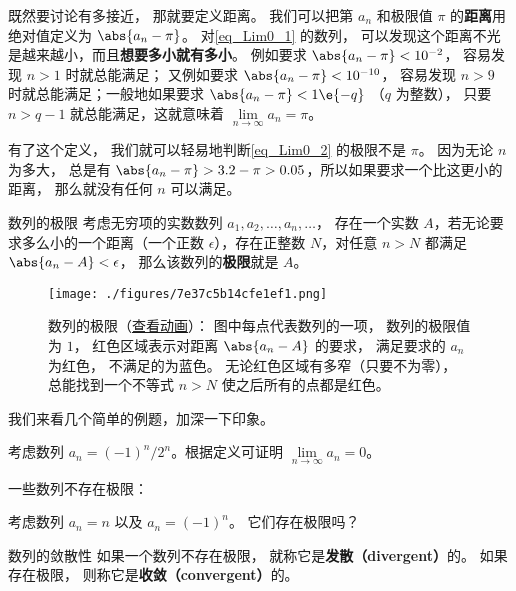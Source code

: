 既然要讨论有多接近， 那就要定义距离。 我们可以把第 $a_n$ 和极限值 $\pi$ 的\textbf{距离}用绝对值定义为 $\abs{a_n - \pi}$。 对\autoref{eq_Lim0_1} 的数列， 可以发现这个距离不光是越来越小，而且\textbf{想要多小就有多小}。 例如要求 $\abs{a_n - \pi} < 10^{-2}$， 容易发现 $n > 1$ 时就总能满足； 又例如要求 $\abs{a_n - \pi} < 10^{-10}$， 容易发现 $n > 9$ 时就总能满足；一般地如果要求 $\abs{a_n - \pi} < 1\e{-q}$ （$q$ 为整数）， 只要 $n > q-1$ 就总能满足，这就意味着 $\lim\limits_{n \to \infty } a_n = \pi$。

有了这个定义， 我们就可以轻易地判断\autoref{eq_Lim0_2} 的极限不是 $\pi$。 因为无论 $n$ 为多大， 总是有 $\abs{a_n - \pi} > 3.2 - \pi > 0.05$，所以如果要求一个比这更小的距离， 那么就没有任何 $n$ 可以满足。

\begin{definition}{数列的极限}\label{def_Lim0_2}
考虑无穷项的实数数列 $a_1, a_2, \dots, a_n, \dots$， 存在一个实数 $A$，若无论要求多么小的一个距离（一个正数 $\epsilon$），存在正整数 $N$，对任意 $n > N$ 都满足 $\abs{a_n - A} < \epsilon$， 那么该数列的\textbf{极限}就是 $A$。
\end{definition}

\begin{figure}[ht]
\centering
\texttt{[image: ./figures/7e37c5b14cfe1ef1.png]}
\caption{数列的极限（\href{https://wuli.wiki/apps/Lim0.html}{查看动画}）： 图中每点代表数列的一项， 数列的极限值为 $1$， 红色区域表示对距离 $\abs{a_n - A}$ 的要求， 满足要求的 $a_n$ 为红色， 不满足的为蓝色。 无论红色区域有多窄（只要不为零）， 总能找到一个不等式 $n > N$ 使之后所有的点都是红色。} \label{fig_Lim0_1}
\end{figure}

我们来看几个简单的例题，加深一下印象。

\begin{example}{}
考虑数列 $a_n= {(-1)^n}/{2^n}$。根据定义可证明 $\lim\limits_{n\to\infty}a_n=0$。
\end{example}

一些数列不存在极限：
\begin{example}{}\label{ex_Lim0_10}
考虑数列 $a_n = n$ 以及 $a_n=(-1)^n$。 它们存在极限吗？
\end{example}

\begin{definition}{数列的敛散性}\label{def_Lim0_4}
如果一个数列不存在极限， 就称它是\textbf{发散（divergent）}的。 如果存在极限， 则称它是\textbf{收敛（convergent）}的。
\end{definition}

